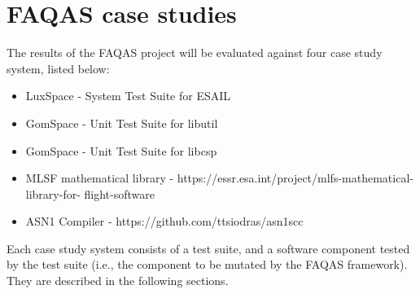 
\chapter{FAQAS case studies}
\label{chapter:caseStudies}

The results of the FAQAS project will be evaluated against four case study system, listed below:

\begin{itemize}
	\item LuxSpace - System Test Suite for ESAIL
	\item GomSpace - Unit Test Suite for libutil
	\item GomSpace - Unit Test Suite for libcsp
	\item MLSF mathematical library - https://essr.esa.int/project/mlfs-mathematical-library-for-
		flight-software
	\item ASN1 Compiler - https://github.com/ttsiodras/asn1scc
\end{itemize}

Each case study system consists of a test suite, 
and a software component tested by the test suite (i.e., the component to be mutated by the FAQAS framework). They are described in the following sections. 


\clearpage



